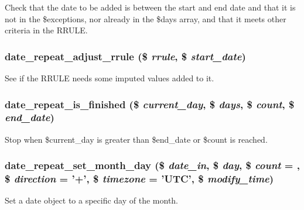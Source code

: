 Check that the date to be added is between the start and end date and that it is not in the \$exceptions, nor already in the \$days array, and that it meets other criteria in the RRULE. \hypertarget{date__repeat__calc_8inc_ac7db442bbe826375c43885aea6f2ab97}{
\subsubsection[{date\_\-repeat\_\-adjust\_\-rrule}]{\setlength{\rightskip}{0pt plus 5cm}date\_\-repeat\_\-adjust\_\-rrule (\$ {\em rrule}, \/  \$ {\em start\_\-date})}}
\label{date__repeat__calc_8inc_ac7db442bbe826375c43885aea6f2ab97}
See if the RRULE needs some imputed values added to it. \hypertarget{date__repeat__calc_8inc_ab88ff1562600418b74f2063c257a33b4}{
\subsubsection[{date\_\-repeat\_\-is\_\-finished}]{\setlength{\rightskip}{0pt plus 5cm}date\_\-repeat\_\-is\_\-finished (\$ {\em current\_\-day}, \/  \$ {\em days}, \/  \$ {\em count}, \/  \$ {\em end\_\-date})}}
\label{date__repeat__calc_8inc_ab88ff1562600418b74f2063c257a33b4}
Stop when \$current\_\-day is greater than \$end\_\-date or \$count is reached. \hypertarget{date__repeat__calc_8inc_a77b30690f7f9b9caab51f3dc4c652aa9}{
\subsubsection[{date\_\-repeat\_\-set\_\-month\_\-day}]{\setlength{\rightskip}{0pt plus 5cm}date\_\-repeat\_\-set\_\-month\_\-day (\$ {\em date\_\-in}, \/  \$ {\em day}, \/  \$ {\em count} = {}, \/  \$ {\em direction} = {\ttfamily '+'}, \/  \$ {\em timezone} = {\ttfamily 'UTC'}, \/  \$ {\em modify\_\-time})}}
\label{date__repeat__calc_8inc_a77b30690f7f9b9caab51f3dc4c652aa9}
Set a date object to a specific day of the month.

